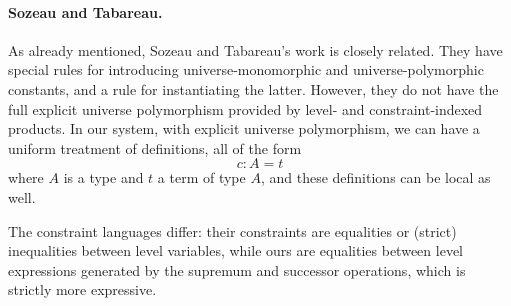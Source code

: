 \documentclass[11pt,a4paper]{article}
\theoremstyle{definition}
\begin{document}




\paragraph{Sozeau and Tabareau.}

As already mentioned, Sozeau and Tabareau's \cite{SozeauTabareau:coq} work is closely related.
They have special rules for introducing universe-monomorphic and universe-polymorphic constants, and a rule for instantiating the latter. However, they do not have the full explicit universe polymorphism provided by level- and constraint-indexed products.
In our system, with explicit universe polymorphism, we can have a uniform treatment of definitions, all of the form
$$ c : A = t$$
where $A$ is a type and $t$ a term of type $A$, and these definitions can be local as well.

The constraint languages differ: their constraints are equalities or (strict) inequalities between level variables, while ours are equalities between level expressions generated by the supremum and successor operations, which is strictly more expressive.
\end{document}
